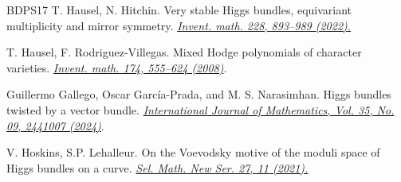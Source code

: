 \documentclass[12pt,reqno]{amsart}
\numberwithin{equation}{subsection}
\theoremstyle{definition}
\theoremstyle{theorem}
\begin{document}
\begin{thebibliography}{BDPS17}
	\newblock T. Hausel, N. Hitchin.
	\newblock Very stable Higgs bundles, equivariant multiplicity and mirror symmetry.
	\newblock \href{https://doi.org/10.1007/s00222-021-01093-7}{\em Invent. math. 228, 893–989 (2022).}
	
	\newblock T. Hausel, F. Rodriguez-Villegas.
	\newblock Mixed Hodge polynomials of character varieties.
	\newblock \href{https://doi.org/10.1007/s00222-008-0142-x}{\em Invent. math. 174, 555–624 (2008)}.
	
	\newblock Guillermo Gallego, Oscar García-Prada, and M. S. Narasimhan.
	\newblock Higgs bundles twisted by a vector bundle.
	\newblock \href{https://doi.org/10.1142/S0129167X24410076}{\em International Journal of Mathematics, Vol. 35, No. 09, 2441007 (2024)}.
	
	\newblock V. Hoskins, S.P. Lehalleur.
	\newblock On the Voevodsky motive of the moduli space of Higgs bundles on a curve. 
	\newblock \href{https://doi.org/10.1007/s00029-020-00610-5}{\em Sel. Math. New Ser. 27, 11 (2021).}
	
\end{thebibliography}
\end{document}
